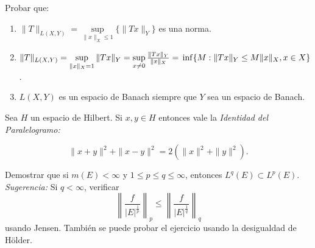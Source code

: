 \documentclass{book}
\begin{document}
\begin{ejer}{} Probar que: 
		\begin{enumerate}
	\item 
$\|T\|_{L(X,Y)}=\sup\limits_{\|x\|_{X}\leq 1}\{\|Tx\|_{Y}\}$
es una norma.
	\item 
 $\|T\|_{L(X,Y)}=\sup\limits_{\|x\|_{X}=1}\|Tx\|_{Y}=
\sup\limits_{x \not =0}\frac{\|Tx\|_{Y}}{\|x\|_{X}}=
\\
\inf\{M:\|Tx\|_{Y}\leq M \|x\|_{X}, x\in X\}$.
\item $L(X,Y)$ es un espacio de Banach siempre que $Y$ sea un espacio de Banach.
		\end{enumerate}
\end{ejer}
		
		
\begin{ejer}{} 
Sea $H$ un espacio de Hilbert. Si $x,y\in H$ entonces vale la {\it{Identidad del Paralelogramo:}}

 $$\|x+y\|^2+\|x-y\|^2=2(\|x\|^2+\|y\|^2). $$
 \end{ejer}
 


	
	
	
	\begin{ejer}{}
 Demostrar que si $m(E)<\infty$ y $1\leq p\leq q \leq \infty$, entonces 
$L^{q}(E)\subset L^{p}(E)$.
\\
{\it Sugerencia:} Si $q<\infty$, verificar 
$$\left\|\frac{f}{|E|^{\frac{1}{p}}}\right\|_p\leq
\left\|\frac{f}{|E|^{\frac{1}{q}}}\right\|_q$$
usando Jensen.
Tambi\'en se puede probar el ejercicio usando la desigualdad de H\"older.
\end{ejer}
\end{document}
